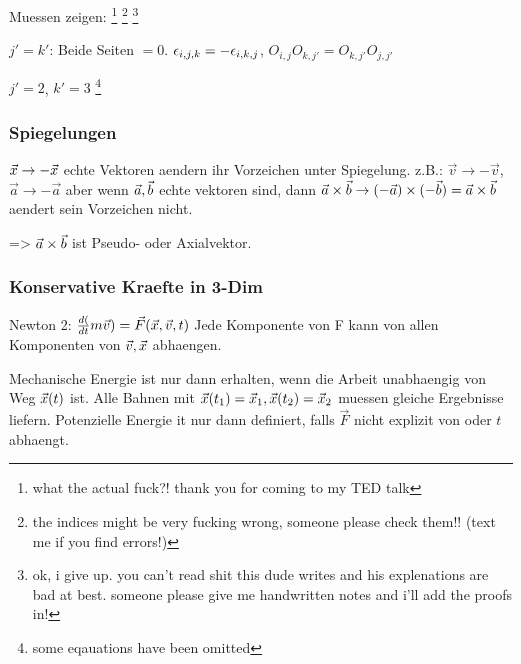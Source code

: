 \documentclass{article}
\begin{document}
Muessen zeigen: \footnote{what the actual fuck?! thank you for coming to my TED talk}
\footnote{the indices might be very fucking wrong, someone please check them!! (text me if you find errors!)}
\footnote{ok, i give up. you can't read shit this dude writes and his explenations are bad at best. someone please give me handwritten notes and i'll add the proofs in!}

$j' = k'$: Beide Seiten $=0$. $\epsilon_{i, j, k} = - \epsilon_{i, k, j}$, $O_{i, j} O_{k, j'} = O_{k, j'} O_{j, j'}$

$j' = 2$, $k' = 3$ \footnote{some eqauations have been omitted}



\subsubsection{Spiegelungen}
$\vec{x} \rightarrow - \vec{x}$ echte Vektoren aendern ihr Vorzeichen unter Spiegelung. 
z.B.: $\vec{v} \rightarrow - \vec{v}$, $\vec{a} \rightarrow - \vec{a}$ aber wenn $\vec{a}, \vec{b}$ echte vektoren sind, dann $\vec{a} \times \vec{b} \rightarrow (-\vec{a})\times (- \vec{b}) = \vec{a} \times \vec{b}$ aendert sein Vorzeichen nicht.

=> $\vec{a} \times \vec{b}$ ist Pseudo- oder Axialvektor.

\subsubsection{Konservative Kraefte in 3-Dim}
Newton 2: ${d (\over dt}m \vec{v}) = \vec{F}(\vec{x}, \vec{v}, t)$ 
Jede Komponente von F kann von allen Komponenten von $\vec{v}, \vec{x}$ abhaengen.



Mechanische Energie ist nur dann erhalten, wenn die Arbeit unabhaengig von Weg $\vec{x}(t)$ ist. 
Alle Bahnen mit $\vec{x}(t_1) = \vec{x}_1, \vec{x}(t_2) = \vec{x}_2$ muessen gleiche Ergebnisse liefern.
Potenzielle Energie it nur dann definiert, falls $\vec{F}$ nicht explizit von oder $t$ abhaengt.
\end{document}
